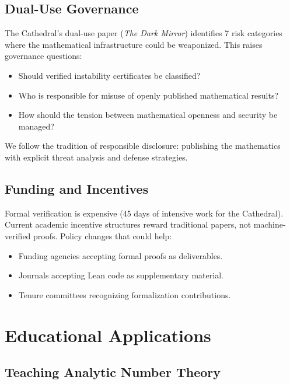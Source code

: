 \documentclass[11pt,a4paper]{article}
\begin{document}
\subsection{Dual-Use Governance}

The Cathedral's dual-use paper (\emph{The Dark Mirror}) identifies
7 risk categories where the mathematical infrastructure could be
weaponized. This raises governance questions:
\begin{itemize}
  \item Should verified instability certificates be classified?
  \item Who is responsible for misuse of openly published
    mathematical results?
  \item How should the tension between mathematical openness and
    security be managed?
\end{itemize}

We follow the tradition of responsible disclosure: publishing
the mathematics with explicit threat analysis and defense strategies.

\subsection{Funding and Incentives}

Formal verification is expensive (45 days of intensive work for
the Cathedral). Current academic incentive structures reward
traditional papers, not machine-verified proofs. Policy changes
that could help:
\begin{itemize}
  \item Funding agencies accepting formal proofs as deliverables.
  \item Journals accepting Lean code as supplementary material.
  \item Tenure committees recognizing formalization contributions.
\end{itemize}

\section{Educational Applications}

\subsection{Teaching Analytic Number Theory}
\end{document}
